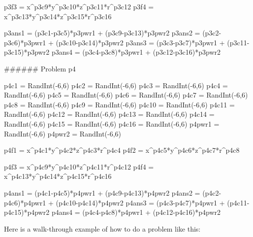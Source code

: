 \documentclass{ximera}
\begin{document}
\begin{sagesilent}
p3f3 = x^p3c9*y^p3c10*z^p3c11*r^p3c12
p3f4 = x^p3c13*y^p3c14*z^p3c15*r^p3c16

p3ans1 = (p3c1-p3c5)*p3pwr1 + (p3c9-p3c13)*p3pwr2
p3ans2 = (p3c2-p3c6)*p3pwr1 + (p3c10-p3c14)*p3pwr2
p3ans3 = (p3c3-p3c7)*p3pwr1 + (p3c11-p3c15)*p3pwr2
p3ans4 = (p3c4-p3c8)*p3pwr1 + (p3c12-p3c16)*p3pwr2


###### Problem p4

p4c1 = RandInt(-6,6)
p4c2 = RandInt(-6,6)
p4c3 = RandInt(-6,6)
p4c4 = RandInt(-6,6)
p4c5 = RandInt(-6,6)
p4c6 = RandInt(-6,6)
p4c7 = RandInt(-6,6)
p4c8 = RandInt(-6,6)
p4c9 = RandInt(-6,6)
p4c10 = RandInt(-6,6)
p4c11 = RandInt(-6,6)
p4c12 = RandInt(-6,6)
p4c13 = RandInt(-6,6)
p4c14 = RandInt(-6,6)
p4c15 = RandInt(-6,6)
p4c16 = RandInt(-6,6)
p4pwr1 = RandInt(-6,6)
p4pwr2 = RandInt(-6,6)

p4f1 = x^p4c1*y^p4c2*z^p4c3*r^p4c4
p4f2 = x^p4c5*y^p4c6*z^p4c7*r^p4c8

p4f3 = x^p4c9*y^p4c10*z^p4c11*r^p4c12
p4f4 = x^p4c13*y^p4c14*z^p4c15*r^p4c16

p4ans1 = (p4c1-p4c5)*p4pwr1 + (p4c9-p4c13)*p4pwr2
p4ans2 = (p4c2-p4c6)*p4pwr1 + (p4c10-p4c14)*p4pwr2
p4ans3 = (p4c3-p4c7)*p4pwr1 + (p4c11-p4c15)*p4pwr2
p4ans4 = (p4c4-p4c8)*p4pwr1 + (p4c12-p4c16)*p4pwr2



\end{sagesilent}

Here is a walk-through example of how to do a problem like this:
\end{document}
